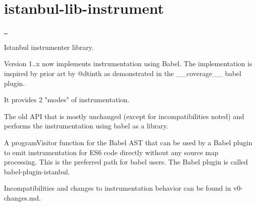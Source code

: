 \chapter{istanbul-\/lib-\/instrument}
\hypertarget{md_pkiclassroomrescheduler_2src_2main_2frontend_2node__modules_2istanbul-lib-instrument_2_r_e_a_d_m_e}{}\label{md_pkiclassroomrescheduler_2src_2main_2frontend_2node__modules_2istanbul-lib-instrument_2_r_e_a_d_m_e}
\label{md_pkiclassroomrescheduler_2src_2main_2frontend_2node__modules_2istanbul-lib-instrument_2_r_e_a_d_m_e_autotoc_md15065}%
%
 \href{https://travis-ci.org/istanbuljs/istanbul-lib-instrument}{\texttt{ }}

Istanbul instrumenter library.

Version 1..\+x now implements instrumentation using {\ttfamily Babel}. The implementation is inspired by prior art by @dtinth as demonstrated in the {\ttfamily \+\_\+\+\_\+coverage\+\_\+\+\_\+} babel plugin.

It provides 2 "{}modes"{} of instrumentation.


\begin{DoxyItemize}
\item The old API that is mostly unchanged (except for incompatibilities noted) and performs the instrumentation using babel as a library.
\item A {\ttfamily program\+Visitor} function for the Babel AST that can be used by a Babel plugin to emit instrumentation for ES6 code directly without any source map processing. This is the preferred path for babel users. The Babel plugin is called {\ttfamily babel-\/plugin-\/istanbul}.
\end{DoxyItemize}

Incompatibilities and changes to instrumentation behavior can be found in v0-\/changes.md. 